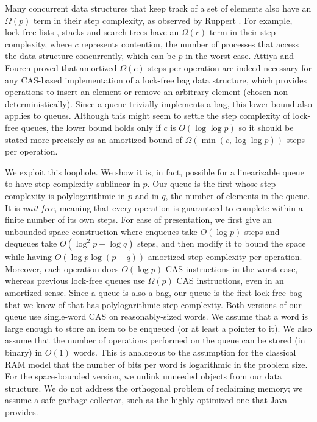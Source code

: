 Many concurrent data structures that keep track of a set of elements also have an $\Omega(p)$ term in their step complexity, as observed by Ruppert \cite{Rup16}.
For example, lock-free lists \cite{FR04,Sha15}, stacks \cite{Tre86} and search trees \cite{EFHR14} 
have an $\Omega(c)$ term in their step complexity, where $c$ represents contention,
the number of processes that access the data structure concurrently, which can be $p$ in the worst case.
Attiya and Fouren \cite{DBLP:conf/opodis/AttiyaF17} proved 
that amortized $\Omega(c)$ steps per operation are indeed necessary
for any CAS-based implementation of a lock-free bag data structure, which provides operations
to insert an element or remove an arbitrary element (chosen non-deterministically).
Since a queue trivially implements a bag, this lower bound also applies to queues.
Although this might seem to settle the step complexity of lock-free queues, the lower bound
holds only if $c$ is $O(\log\log p)$ so it should be stated more precisely as
an amortized bound of $\Omega(\min(c,\log\log p))$ steps per operation.

We exploit this loophole.  We show  it is, in fact, possible for a linearizable queue
to have step complexity sublinear in $p$.
Our queue is the first whose step complexity  is polylogarithmic in $p$ and in $q$, the number of elements in the queue.
It is \emph{wait-free}, meaning that every operation is guaranteed to complete within a finite number of its own steps.
For ease of presentation, we first give an unbounded-space construction where enqueues take $O(\log p)$ steps and
dequeues take $O(\log^2 p + \log q)$ steps,
and then modify it to bound the space
while  having $O(\log p\log( p+ q))$ amortized step complexity  per operation.
Moreover, each operation does $O(\log p)$ CAS instructions in the worst case, whereas previous
lock-free queues use 
$\Omega(p)$ CAS instructions, even in an amortized sense.
Since a queue is also a bag, our queue is the first lock-free bag that we know of that has polylogarithmic step complexity.
Both versions of our queue use single-word CAS on reasonably-sized 
words.
We assume that a word is large enough to store an item to be enqueued (or at least a pointer to it).  We also assume that the number of operations performed on the queue can be stored (in binary) in $O(1)$ words.
This is analogous to the assumption for the classical RAM model that the number of bits per word is logarithmic in the problem size.
For the space-bounded version, we unlink unneeded objects from our data structure.
We do not address the orthogonal problem of reclaiming memory; we assume a safe
garbage collector, such as the highly optimized one that Java provides.

